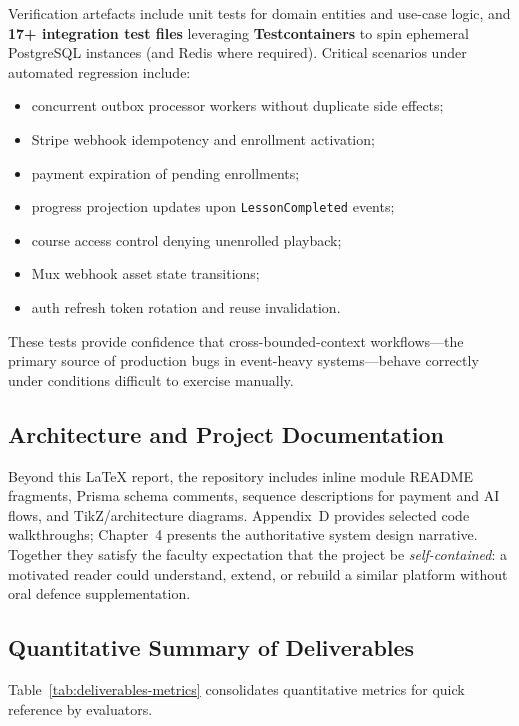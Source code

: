 Verification artefacts include unit tests for domain entities and use-case logic, and \textbf{17+ integration test files} leveraging \textbf{Testcontainers} to spin ephemeral PostgreSQL instances (and Redis where required). Critical scenarios under automated regression include:
\begin{itemize}
  \item concurrent outbox processor workers without duplicate side effects;
  \item Stripe webhook idempotency and enrollment activation;
  \item payment expiration of pending enrollments;
  \item progress projection updates upon \texttt{LessonCompleted} events;
  \item course access control denying unenrolled playback;
  \item Mux webhook asset state transitions;
  \item auth refresh token rotation and reuse invalidation.
\end{itemize}

These tests provide confidence that cross-bounded-context workflows---the primary source of production bugs in event-heavy systems---behave correctly under conditions difficult to exercise manually.

\subsection{Architecture and Project Documentation}
\label{subsec:outcome-docs}

Beyond this LaTeX report, the repository includes inline module README fragments, Prisma schema comments, sequence descriptions for payment and AI flows, and TikZ/architecture diagrams. Appendix~D provides selected code walkthroughs; Chapter~4 presents the authoritative system design narrative. Together they satisfy the faculty expectation that the project be \textit{self-contained}: a motivated reader could understand, extend, or rebuild a similar platform without oral defence supplementation.

\subsection{Quantitative Summary of Deliverables}
\label{subsec:outcome-metrics}

Table~\ref{tab:deliverables-metrics} consolidates quantitative metrics for quick reference by evaluators.

